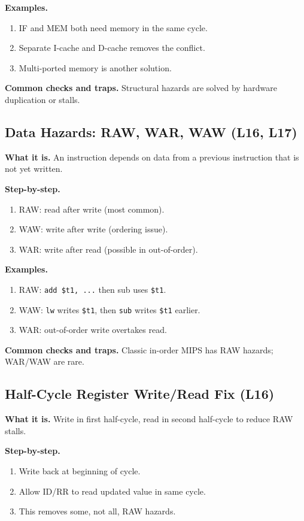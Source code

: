 \documentclass[11pt]{article}
\begin{document}
\textbf{Examples.}
\begin{enumerate}[leftmargin=*]
  \item IF and MEM both need memory in the same cycle.
  \item Separate I-cache and D-cache removes the conflict.
  \item Multi-ported memory is another solution.
\end{enumerate}

\textbf{Common checks and traps.} Structural hazards are solved by hardware duplication or stalls.

\subsection{Data Hazards: RAW, WAR, WAW (L16, L17)}
\textbf{What it is.} An instruction depends on data from a previous instruction that is not yet written.

\textbf{Step-by-step.}
\begin{enumerate}[leftmargin=*]
  \item RAW: read after write (most common).
  \item WAW: write after write (ordering issue).
  \item WAR: write after read (possible in out-of-order).
\end{enumerate}

\textbf{Examples.}
\begin{enumerate}[leftmargin=*]
  \item RAW: \texttt{add \$t1, ...} then sub uses \texttt{\$t1}.
  \item WAW: \texttt{lw} writes \texttt{\$t1}, then \texttt{sub} writes \texttt{\$t1} earlier.
  \item WAR: out-of-order write overtakes read.
\end{enumerate}

\textbf{Common checks and traps.} Classic in-order MIPS has RAW hazards; WAR/WAW are rare.

\subsection{Half-Cycle Register Write/Read Fix (L16)}
\textbf{What it is.} Write in first half-cycle, read in second half-cycle to reduce RAW stalls.

\textbf{Step-by-step.}
\begin{enumerate}[leftmargin=*]
  \item Write back at beginning of cycle.
  \item Allow ID/RR to read updated value in same cycle.
  \item This removes some, not all, RAW hazards.
\end{enumerate}
\end{document}
